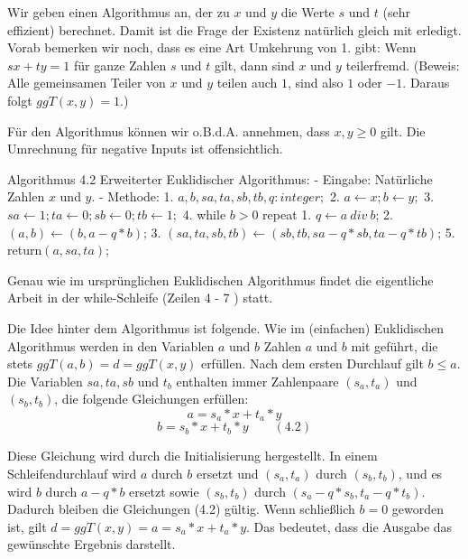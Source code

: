 \documentclass[a4paper]{article}
\begin{document}
\begin{multicols}{3}
    Wir geben einen Algorithmus an, der zu $x$ und $y$ die Werte $s$ und $t$ (sehr effizient) berechnet. Damit ist die Frage der Existenz natürlich gleich mit erledigt. Vorab bemerken wir noch, dass es eine Art Umkehrung von 1. gibt: Wenn $sx+ty= 1$ für ganze Zahlen $s$ und $t$ gilt, dann sind $x$ und $y$ teilerfremd. (Beweis: Alle gemeinsamen Teiler von $x$ und $y$ teilen auch $1$, sind also $1$ oder $-1$. Daraus folgt $ggT(x,y) = 1$.)

    Für den Algorithmus können wir o.B.d.A. annehmen, dass $x,y\geq 0$ gilt. Die Umrechnung für negative Inputs ist offensichtlich.

    Algorithmus 4.2 Erweiterter Euklidischer Algorithmus:
    - Eingabe: Natürliche Zahlen $x$ und $y$.
    - Methode:
    1. $a,b,sa,ta,sb,tb,q:integer;$
    2. $a\leftarrow x; b\leftarrow y;$
    3. $sa\leftarrow 1; ta\leftarrow 0; sb\leftarrow 0; tb\leftarrow 1;$
    4. while $b> 0$ repeat
    1. $q\leftarrow a\ div\ b$;
    2. $(a,b)\leftarrow (b,a-q*b)$;
    3. $(sa,ta,sb,tb)\leftarrow (sb,tb,sa-q*sb,ta-q*tb)$;
    5. return$(a,sa,ta)$;

    Genau wie im ursprünglichen Euklidischen Algorithmus findet die eigentliche Arbeit in der while-Schleife (Zeilen 4 - 7 ) statt.

    Die Idee hinter dem Algorithmus ist folgende. Wie im (einfachen) Euklidischen Algorithmus werden in den Variablen $a$ und $b$ Zahlen $a$ und $b$ mit geführt, die stets $ggT(a,b) =d= ggT(x,y)$ erfüllen. Nach dem ersten Durchlauf gilt $b\leq a$. Die Variablen $sa,ta,sb$ und $t_b$ enthalten immer Zahlenpaare $(s_a,t_a)$ und $(s_b,t_b)$, die folgende Gleichungen erfüllen:
    $$a=s_a*x+t_a*y$$
    $$b=s_b*x+t_b*y \quad\quad(4.2)$$

    Diese Gleichung wird durch die Initialisierung hergestellt. In einem Schleifendurchlauf wird $a$ durch $b$ ersetzt und $(s_a,t_a)$ durch $(s_b,t_b)$, und es wird $b$ durch $a-q*b$ ersetzt sowie $(s_b,t_b)$ durch $(s_a-q*s_b, t_a-q*t_b)$. Dadurch bleiben die Gleichungen (4.2) gültig. Wenn schließlich $b=0$ geworden ist, gilt $d=ggT(x,y) =a=s_a*x+t_a*y$. Das bedeutet, dass die Ausgabe das gewünschte Ergebnis darstellt.


\end{multicols}
\end{document}
